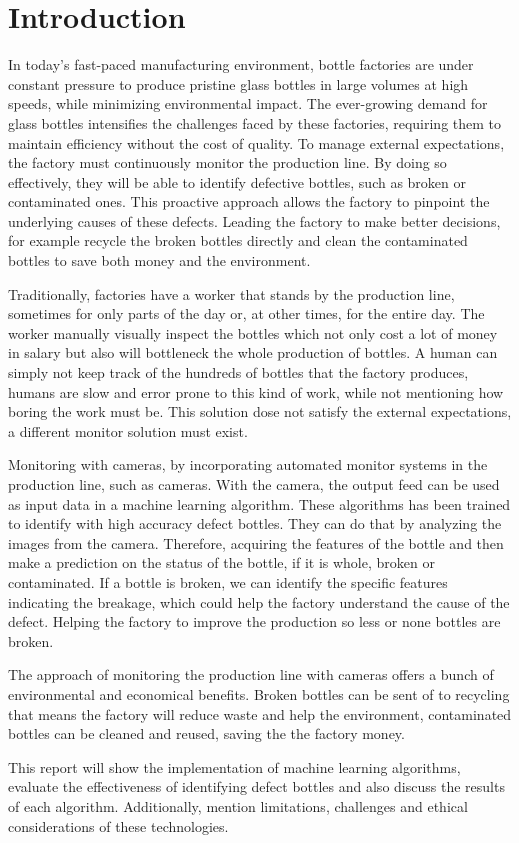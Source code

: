 \section{Introduction}

In today’s fast-paced manufacturing environment, bottle factories are under constant pressure to produce pristine glass bottles in large volumes at high speeds, while minimizing environmental impact. 
The ever-growing demand for glass bottles \cite{ReturnableBottles} intensifies the challenges faced by these factories, requiring them to maintain efficiency without the cost of quality.  
To manage external expectations, the factory must continuously monitor the production line. By doing so effectively, they will be able to identify defective bottles, such as broken or contaminated ones. This proactive approach allows the factory to pinpoint the underlying causes of these defects.
Leading the factory to make better decisions, for example recycle the broken bottles directly and clean the contaminated bottles to save both money and the environment.
\par
Traditionally, factories have a worker that stands by the production line, sometimes for only parts of the day or, at other times, for the entire day. 
The worker manually visually inspect the bottles which not only cost a lot of money in salary but also will bottleneck the whole production of bottles.
A human can simply not keep track of the hundreds of bottles that the factory produces, humans are slow and error prone to this kind of work, while not mentioning how boring the work must be. 
This solution dose not satisfy the external expectations, a different monitor solution must exist.
\par
Monitoring with cameras, by incorporating automated monitor systems in the production line, such as cameras. 
With the camera, the output feed can be used as input data in a machine learning algorithm. 
These algorithms has been trained to identify with high accuracy defect bottles. 
They can do that by analyzing the images from the camera.
Therefore, acquiring the features of the bottle and then make a prediction on the status of the bottle, if it is whole, broken or contaminated.
If a bottle is broken, we can identify the specific features indicating the breakage, which could help the factory understand the cause of the defect.
Helping the factory to improve the production so less or none bottles are broken. 
\par
The approach of monitoring the production line with cameras offers a bunch of environmental and economical benefits.
Broken bottles can be sent of to recycling that means the factory will reduce waste and help the environment, contaminated bottles can be cleaned and reused, saving the the factory money.
\par
This report will show the implementation of machine learning algorithms, evaluate the effectiveness of identifying defect bottles and also discuss the results of each algorithm.
Additionally, mention limitations, challenges and ethical considerations of these technologies.
